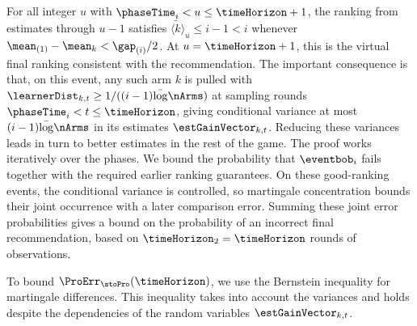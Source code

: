 For all integer $u$ with $\phaseTime_i<u\leq\timeHorizon+1$,
the ranking from estimates through $u-1$ satisfies
$\tilde{\langle k\rangle}_u\leq i-1<i$ whenever
$\mean_{(1)}-\mean_k<\gap_{(i)}/2$.
At $u=\timeHorizon+1$, this is the virtual final ranking consistent
with the recommendation.
The important consequence is that, on this event, any such arm $k$
is pulled with $\learnerDist_{k,t}\geq1/((i-1)\bar\log\nArms)$ at
sampling rounds $\phaseTime_i<t\leq\timeHorizon$, giving conditional
variance at most $(i-1)\bar\log\nArms$ in its estimates
$\estGainVector_{k,t}$.
Reducing these variances leads 
in turn to  better estimates in the 
rest of the game.
The proof works iteratively over the phases. We bound the probability
that $\eventbob_i$ fails together with the required earlier ranking
guarantees. On these good-ranking events, the conditional variance is
controlled, so martingale concentration bounds their joint occurrence
with a later comparison error. Summing these joint error probabilities
gives a bound on the probability of an incorrect final recommendation,
based on $\timeHorizon_2=\timeHorizon$ rounds of observations.

To bound $\ProErr_{\stoPro}(\timeHorizon)$,
we use the Bernstein inequality for martingale  differences. This inequality takes into account the 
variances and holds despite the dependencies of the random 
variables $\estGainVector_{k,t}$.

